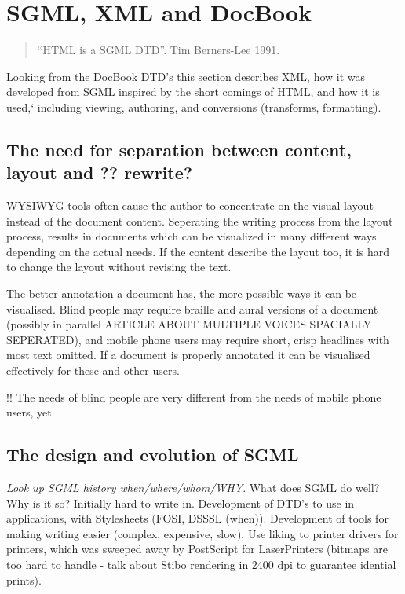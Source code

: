 
\section{SGML, XML and DocBook}

\begin{quotation}
\textsf{  ``HTML is a SGML DTD''.  Tim Berners-Lee 1991. }
\end{quotation}

Looking from the DocBook DTD's this \textsf{section} describes XML,
how it was developed from SGML inspired by the short comings of HTML,
and how it is used,` including viewing, authoring, and conversions
(transforms, formatting).



\subsection{The need for separation between content, layout and
  \textsf{??} \textsf{rewrite?}}

WYSIWYG tools often cause the author to concentrate on the visual
layout instead of the document content.  Seperating the writing
process from the layout process, results in documents which can be
visualized in many different ways depending on the actual needs.  If
the content describe the layout too, it is hard to change the layout
without revising the text.

The better annotation a document has, the more possible ways it can be
visualised.  Blind people may require braille and aural versions of a
document (possibly in parallel \textsf{ARTICLE ABOUT MULTIPLE VOICES
  SPACIALLY SEPERATED}), and mobile phone users may require short,
crisp headlines with most text omitted.  If a document is
properly annotated it can be visualised effectively for these and
other users.

\textsf{!!} The \textsf{needs of blind people} are very different
from the \textsf{needs of mobile phone users}, yet 

\subsection{The design and evolution of SGML}

\emph{Look up SGML history when/where/whom/\emph{WHY}}.  What does
SGML do well?  Why is it so?  Initially hard to write in. Development
of DTD's to use in applications, with Stylesheets (FOSI, DSSSL
(when)).  Development of tools for making writing easier (complex,
expensive, slow).  Use liking to printer drivers for printers, which
was sweeped away by PostScript for LaserPrinters (bitmaps are too hard
to handle - talk about Stibo rendering in 2400 dpi to guarantee
idential prints).




